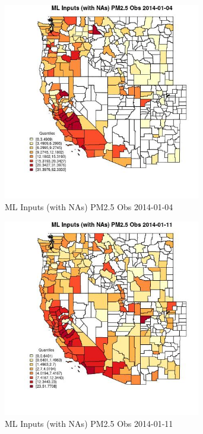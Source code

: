 \begin{figure} 
\centering  
\includegraphics[width=0.77\textwidth]{Code_Outputs/Report_ML_input_PM25_Step4_part_e_de_duplicated_aveswNAs_CountyPM25_ObsMean2014-01-04_2014-01-04.jpg} 
\caption{\label{fig:Report_ML_input_PM25_Step4_part_e_de_duplicated_aveswNAsCountyPM25_ObsMean2014-01-04_2014-01-04}ML Inputs (with NAs) PM2.5 Obs 2014-01-04} 
\end{figure} 
 

\begin{figure} 
\centering  
\includegraphics[width=0.77\textwidth]{Code_Outputs/Report_ML_input_PM25_Step4_part_e_de_duplicated_aveswNAs_CountyPM25_ObsMean2014-01-11_2014-01-11.jpg} 
\caption{\label{fig:Report_ML_input_PM25_Step4_part_e_de_duplicated_aveswNAsCountyPM25_ObsMean2014-01-11_2014-01-11}ML Inputs (with NAs) PM2.5 Obs 2014-01-11} 
\end{figure} 
 

